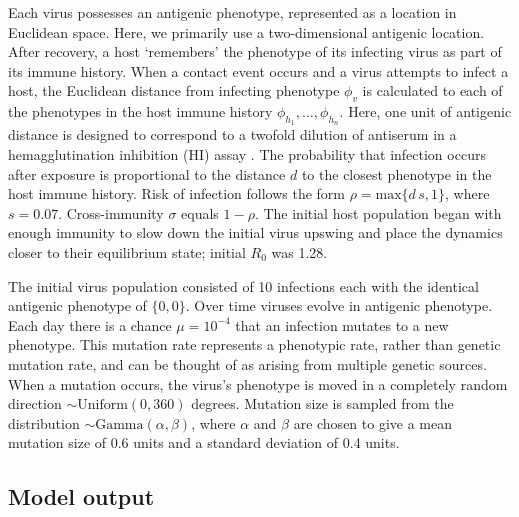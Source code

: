 \documentclass[11pt,oneside,letterpaper]{article}
\begin{document}
Each virus possesses an antigenic phenotype, represented as a location in Euclidean space.  Here, we primarily use a two-dimensional antigenic location.  After recovery, a host `remembers' the phenotype of its infecting virus as part of its immune history.  When a contact event occurs and a virus attempts to infect a host, the Euclidean distance from infecting phenotype $\phi_v$ is calculated to each of the phenotypes in the host immune history $\phi_{h_1}, \dots, \phi_{h_n}$.  Here, one unit of antigenic distance is designed to correspond to a twofold dilution of antiserum in a hemagglutination inhibition (HI) assay \cite{Smith04}. The probability that infection occurs after exposure is proportional to the distance $d$ to the closest phenotype in the host immune history.  Risk of infection follows the form $\rho = \textrm{max}\{d\,s,1\}$, where $s=0.07$.  Cross-immunity $\sigma$ equals $1-\rho$.  The initial host population began with enough immunity to slow down the initial virus upswing and place the dynamics closer to their equilibrium state; initial $R_0$ was 1.28.

The initial virus population consisted of 10 infections each with the identical antigenic phenotype of $\{0,0\}$.  Over time viruses evolve in antigenic phenotype.  Each day there is a chance $\mu = 10^{-4}$ that an infection mutates to a new phenotype.  This mutation rate represents a phenotypic rate, rather than genetic mutation rate, and can be thought of as arising from multiple genetic sources.  When a mutation occurs, the virus's phenotype is moved in a completely random direction $\sim \textrm{Uniform}(0,360)$ degrees. Mutation size is sampled from the distribution $\sim \textrm{Gamma}(\alpha,\beta)$, where $\alpha$ and $\beta$ are chosen to give a mean mutation size of 0.6 units and a standard deviation of 0.4 units.  

\subsection*{Model output}
\end{document}
